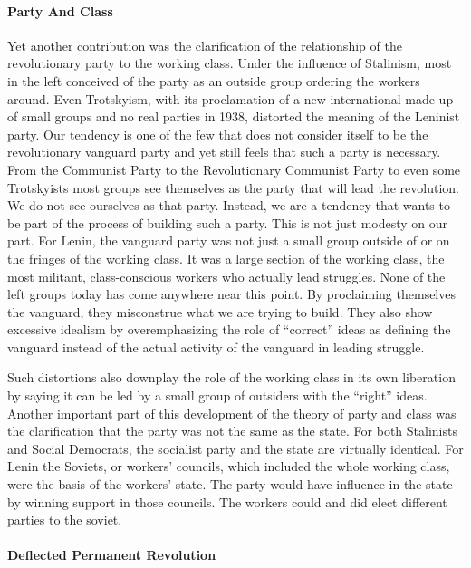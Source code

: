\paragraph{Party And Class}

Yet another contribution was the clarification of the relationship of the revolutionary party to the working class. Under the influence of Stalinism, most in the left conceived of the party as an outside group ordering the workers around. Even Trotskyism, with its proclamation of a new international made up of small groups and no real parties in 1938, distorted the meaning of the Leninist party. Our tendency is one of the few that does not consider itself to be the revolutionary vanguard party and yet still feels that such a party is necessary. From the Communist Party to the Revolutionary Communist Party to even some Trotskyists most groups see themselves as the party that will lead the revolution. We do not see ourselves as that party. Instead, we are a tendency that wants to be part of the process of building such a party. This is not just modesty on our part. For Lenin, the vanguard party was not just a small group outside of or on the fringes of the working class. It was a large section of the working class, the most militant, class-conscious workers who actually lead struggles. None of the left groups today has come anywhere near this point. By proclaiming themselves the vanguard, they misconstrue what we are trying to build. They also show excessive idealism by overemphasizing the role of ``correct'' ideas as defining the vanguard instead of the actual activity of the vanguard in leading struggle.

Such distortions also downplay the role of the working class in its own liberation by saying it can be led by a small group of outsiders with the ``right'' ideas. Another important part of this development of the theory of party and class was the clarification that the party was not the same as the state. For both Stalinists and Social Democrats, the socialist party and the state are virtually identical. For Lenin the Soviets, or workers' councils, which included the whole working class, were the basis of the workers' state. The party would have influence in the state by winning support in those councils. The workers could and did elect different parties to the soviet.

\paragraph{Deflected Permanent Revolution}

